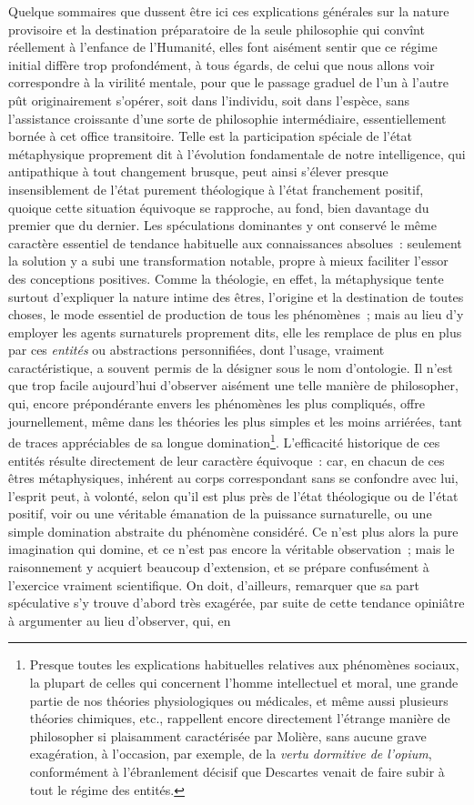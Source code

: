 \documentclass[french,twoside]{book} %
\begin{document}
Quelque sommaires que dussent être ici ces explications générales sur la nature provisoire et la destination préparatoire de la seule philosophie qui convînt réellement à l’enfance de l’Humanité, elles font aisément sentir que ce régime initial diffère trop profondément, à tous égards, de celui que nous allons voir correspondre à la virilité mentale, pour que le passage graduel de l’un à l’autre pût originairement s’opérer, soit dans l’individu, soit dans l’espèce, sans l’assistance croissante d’une sorte de philosophie intermédiaire, essentiellement bornée à cet office transitoire. Telle est la participation spéciale de l’état métaphysique proprement dit à l’évolution fondamentale de notre intelligence, qui antipathique à tout changement brusque, peut ainsi s’élever presque insensiblement de l’état purement théologique à l’état franchement positif, quoique cette situation équivoque se rapproche, au fond, bien davantage du premier que du dernier. Les spéculations dominantes y ont conservé le même caractère essentiel de tendance habituelle aux connaissances absolues : seulement la solution y a subi une transformation notable, propre à mieux faciliter l’essor des conceptions positives. Comme la théologie, en effet, la métaphysique tente surtout d’expliquer la nature intime des êtres, l’origine et la destination de toutes choses, le mode essentiel de production de tous les phénomènes ; mais au lieu d’y employer les agents surnaturels proprement dits, elle les remplace de plus en plus par ces {\itshape entités} ou abstractions personnifiées, dont l’usage, vraiment caractéristique, a souvent permis de la désigner sous le nom d’ontologie. Il n’est que trop facile aujourd’hui d’observer aisément une telle manière de philosopher, qui, encore prépondérante envers les phénomènes les plus compliqués, offre journellement, même dans les théories les plus simples et les moins arriérées, tant de traces appréciables de sa longue domination\footnote{ Presque toutes les explications habituelles relatives aux phénomènes sociaux, la plupart de celles qui concernent l’homme intellectuel et moral, une grande partie de nos théories physiologiques ou médicales, et même aussi plusieurs théories chimiques, etc., rappellent encore directement l’étrange manière de philosopher si plaisamment caractérisée par Molière, sans aucune grave exagération, à l’occasion, par exemple, de la {\itshape vertu dormitive de l’opium}, conformément à l’ébranlement décisif que Descartes venait de faire subir à tout le régime des entités.}. L’efficacité historique de ces entités résulte directement de leur caractère équivoque : car, en chacun de ces êtres métaphysiques, inhérent au corps correspondant sans se confondre avec lui, l’esprit peut, à volonté, selon qu’il est plus près de l’état théologique ou de l’état positif, voir ou une véritable émanation de la puissance surnaturelle, ou une simple domination abstraite du phénomène considéré. Ce n’est plus alors la pure imagination qui domine, et ce n’est pas encore la véritable observation ; mais le raisonnement y acquiert beaucoup d’extension, et se prépare confusément à l’exercice vraiment scientifique. On doit, d’ailleurs, remarquer que sa part spéculative s’y trouve d’abord très exagérée, par suite de cette tendance opiniâtre à argumenter au lieu d’observer, qui, en 
\end{document}
